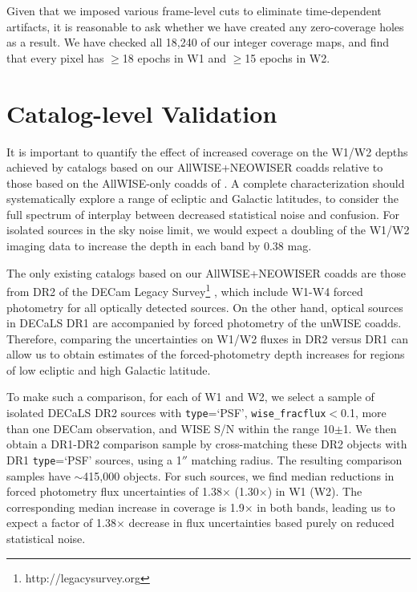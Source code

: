 \documentclass{emulateapj}
\begin{document}
Given that we imposed various frame-level cuts to eliminate time-dependent 
artifacts, it is reasonable to ask whether we have created any zero-coverage 
holes as a result. We have checked all 18,240 of our integer coverage maps, and
find that every pixel has $\ge$18 epochs in W1 and $\ge$15 epochs in W2.

\section{Catalog-level Validation}
\label{sec:depth}

It is important to quantify the effect of increased coverage on
the W1/W2 depths achieved by catalogs based on our AllWISE+NEOWISER coadds 
relative to those based on the AllWISE-only coadds of \cite{lang14}. A
complete characterization should systematically explore a range of 
ecliptic and Galactic latitudes, to consider the full spectrum of interplay
between decreased statistical noise and confusion. For isolated sources in the 
sky noise limit, we would expect a doubling of the W1/W2 imaging data
to increase the depth in each band by 0.38 mag.

The only existing catalogs based on our AllWISE+NEOWISER coadds
are those from DR2 of the DECam Legacy Survey\footnote{http://legacysurvey.org} 
\citep[DECaLS,][]{decals}, which include W1-W4 forced photometry for all
optically detected sources. On the other hand, optical sources in DECaLS DR1
are accompanied by forced photometry of the \cite{lang14} unWISE coadds. 
Therefore, comparing the uncertainties on W1/W2 fluxes in DR2 versus DR1 can 
allow us to obtain estimates of the forced-photometry depth increases for 
regions of low ecliptic and high Galactic latitude.

To make such a comparison, for each of W1 and W2, we select a sample of 
isolated DECaLS DR2 sources with \verb|type|=`PSF', \verb|wise_fracflux|$<$0.1,
more than one DECam observation, and WISE S/N within the range 10$\pm$1. We
then obtain a DR1-DR2 comparison sample by cross-matching these DR2 objects
with DR1 \verb|type|=`PSF' sources, using a 1$''$ matching radius. The resulting
comparison samples have $\sim$415,000 objects. For such
sources, we find median reductions in forced photometry flux uncertainties
of 1.38$\times$ (1.30$\times$) in W1 (W2). The corresponding median increase in
coverage is 1.9$\times$ in both bands, leading us to expect a factor of 
1.38$\times$ decrease in flux uncertainties based purely on reduced statistical 
noise.
\end{document}

